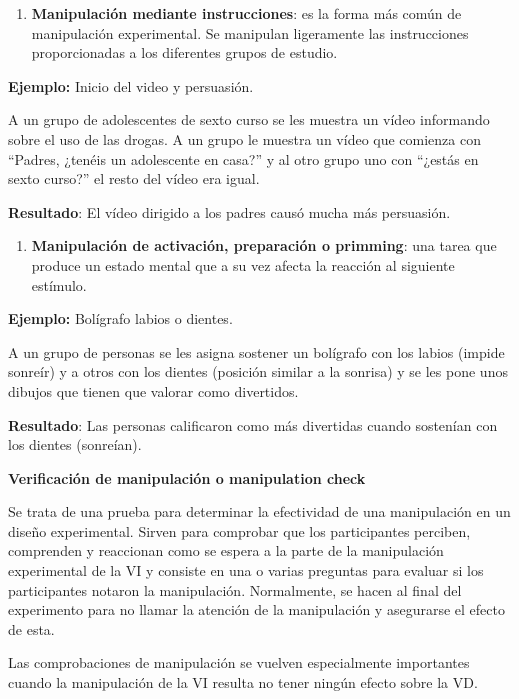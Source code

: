 \documentclass[
]{website}
\providecommand{\tightlist}{%
  \setlength{\itemsep}{0pt}\setlength{\parskip}{0pt}}
\begin{document}
\begin{enumerate}
\def\labelenumi{\arabic{enumi}.}
\setcounter{enumi}{3}
\tightlist
\item
  \textbf{Manipulación mediante instrucciones}: es la forma más común de manipulación experimental. Se manipulan ligeramente las instrucciones proporcionadas a los diferentes grupos de estudio.
\end{enumerate}

\textbf{Ejemplo:} Inicio del video y persuasión.

A un grupo de adolescentes de sexto curso se les muestra un vídeo informando sobre el uso de las drogas. A un grupo le muestra un vídeo que comienza con ``Padres, ¿tenéis un adolescente en casa?'' y al otro grupo uno con ``¿estás en sexto curso?'' el resto del vídeo era igual.

\textbf{Resultado}: El vídeo dirigido a los padres causó mucha más persuasión.

\begin{enumerate}
\def\labelenumi{\arabic{enumi}.}
\setcounter{enumi}{4}
\tightlist
\item
  \textbf{Manipulación de activación, preparación o primming}: una tarea que produce un estado mental que a su vez afecta la reacción al siguiente estímulo.
\end{enumerate}

\textbf{Ejemplo:} Bolígrafo labios o dientes.

A un grupo de personas se les asigna sostener un bolígrafo con los labios (impide sonreír) y a otros con los dientes (posición similar a la sonrisa) y se les pone unos dibujos que tienen que valorar como divertidos.

\textbf{Resultado}: Las personas calificaron como más divertidas cuando sostenían con los dientes (sonreían).

\textbf{Verificación de manipulación o manipulation check}

Se trata de una prueba para determinar la efectividad de una manipulación en un diseño experimental. Sirven para comprobar que los participantes perciben, comprenden y reaccionan como se espera a la parte de la manipulación experimental de la VI y consiste en una o varias preguntas para evaluar si los participantes notaron la manipulación. Normalmente, se hacen al final del experimento para no llamar la atención de la manipulación y asegurarse el efecto de esta.

Las comprobaciones de manipulación se vuelven especialmente importantes cuando la manipulación de la VI resulta no tener ningún efecto sobre la VD.
\end{document}
